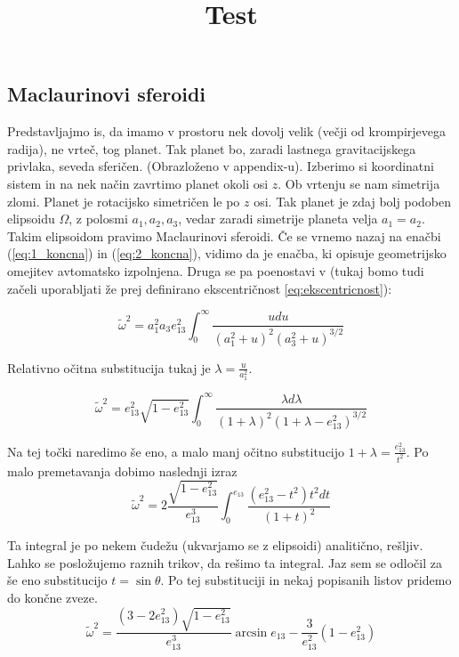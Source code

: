 \documentclass{article}
\theoremstyle{definition}
\theoremstyle{plain}
\numberwithin{definition}{section}
\numberwithin{theorem}{section} \title{Test}
\begin{document}
\subsection{Maclaurinovi sferoidi}
Predstavljajmo is, da imamo v prostoru nek dovolj velik 
(večji od krompirjevega radija), ne vrteč, tog planet. Tak planet bo, zaradi 
lastnega gravitacijskega privlaka, seveda sferičen. 
(Obrazloženo v appendix-u).
Izberimo si koordinatni sistem in na nek način zavrtimo planet okoli osi $z$.
Ob vrtenju se nam simetrija zlomi. Planet je rotacijsko simetričen le po $z$
osi. Tak planet je zdaj bolj podoben elipsoidu $\Omega$, z polosmi 
$a_1, a_2, a_3$, vedar zaradi simetrije planeta velja $a_1 = a_2$. Takim
elipsoidom pravimo Maclaurinovi sferoidi. 
Če se vrnemo nazaj na enačbi (\ref{eq:1_koncna}) in (\ref{eq:2_koncna}),
vidimo da je enačba, ki opisuje geometrijsko omejitev avtomatsko izpolnjena.
Druga se pa poenostavi v 
(tukaj bomo tudi začeli uporabljati že prej definirano ekscentričnost
\ref{eq:ekscentricnost}):

\begin{equation}
	\tilde{\omega}^2 = a_1^2 a_3 e_{13}^2
	\int_0^{\infty} \frac{udu}{(a_1^2+u)^2(a_3^2+u)^{3/2}}
	\label{eq:mc_zveza}
\end{equation}

Relativno očitna substitucija tukaj je $\lambda = \frac{u}{a_1^2}$.

\begin{equation}	
	\tilde{\omega}^2 = e_{13}^2 \sqrt{1 - e_{13}^2} 
	\int_0^{\infty} 
	\frac{\lambda d \lambda}{(1+\lambda)^2(1 + \lambda - e_{13}^2)^{3/2}}
	\label{eq:mc_zveza_sub}
\end{equation}

Na tej točki naredimo še eno, a malo manj očitno substitucijo 
$1 + \lambda = \frac{e_{13}^2}{t^2}$. 
Po malo premetavanja dobimo naslednji izraz
\begin{equation}	
	\tilde{\omega}^2 = 2\frac{\sqrt{1 - e_{13}^2}}{e_{13}^3}
	\int_0^{e_{13}} 
	\frac{(e_{13}^2 - t^2) t^2 dt}{(1 + t)^2}
	\label{eq:mc_zveza_sub_2}
\end{equation}

Ta integral je po nekem čudežu (ukvarjamo se z elipsoidi) analitično, rešljiv. 
Lahko se posložujemo raznih trikov, da rešimo ta integral. Jaz sem se odločil
za še eno substitucijo $t = \sin \theta$. Po tej substituciji in nekaj
popisanih listov pridemo do končne zveze.
\begin{equation}
	\tilde{\omega}^2 = 
	\frac{(3 - 2e_{13}^2) \sqrt{1 - e_{13}^2}}{e_{13}^3} \arcsin{e_{13}} - 
	\frac{3}{e_{13}^2}(1 - e_{13}^2)
	\label{eq:mc_kotna_hitrost}
\end{equation}
\end{document}
